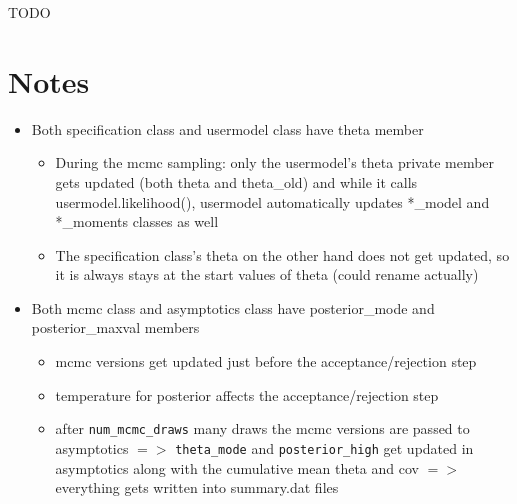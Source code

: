 \documentclass[11pt, letterpaper, notitlepage]{article}
\begin{document}
\pagebreak



TODO


\pagebreak 

\section*{Notes}

\begin{itemize}
\item Both specification class and usermodel class have theta member
\begin{itemize}
\item During the mcmc sampling: only the usermodel's theta private member gets updated (both theta and theta\_old) and while it calls usermodel.likelihood(), usermodel automatically updates *\_model and *\_moments classes as well
\item The specification class's theta on the other hand does not get updated, so it is always stays at the start values of theta (could rename actually)
\end{itemize}

\item Both mcmc class and asymptotics class have posterior\_mode and posterior\_maxval members
\begin{itemize}
\item mcmc versions get updated just before the acceptance/rejection step 
\item temperature for posterior affects the acceptance/rejection step 
\item after \texttt{num\_mcmc\_draws} many draws the mcmc versions are passed to asymptotics $=>$ \texttt{theta\_mode} and \texttt{posterior\_high} get updated in asymptotics along with the cumulative mean theta and cov $=>$ everything gets written into summary.dat files 
\end{itemize}
\end{itemize}


\newpage
\appendix
\vspace{48pt}


\end{document}
